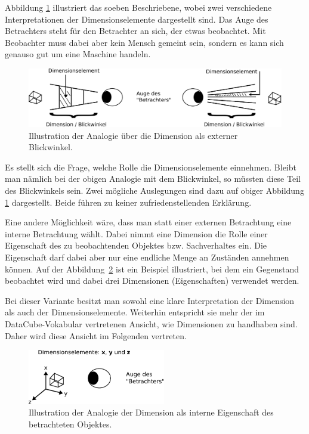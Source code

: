 \documentclass[11pt]{article}
\newcommand{\com}[1]{\marginpar{\em {\small{#1}}}} %
\begin{document}
Abbildung \ref{fig:DimensionelementAnalogy_PointOfViewParts} illustriert das soeben Beschriebene, wobei zwei verschiedene Interpretationen der Dimensionselemente dargestellt sind. Das Auge des Betrachters steht für den Betrachter an sich, der etwas beobachtet. Mit Beobachter muss dabei aber kein Mensch gemeint sein, sondern es kann sich genauso gut um eine Maschine handeln. \\

%
%
\begin{figure}[h!]
    \centering
    \includegraphics[width=12.5cm]{DataCube/DimensionelementAnalogy_PointOfViewParts.pdf}
    \caption{Illustration der Analogie über die Dimension als externer Blickwinkel.}
    \label{fig:DimensionelementAnalogy_PointOfViewParts}
\end{figure}

\noindent
Es stellt sich die Frage, welche Rolle die Dimensionselemente einnehmen. Bleibt man nämlich bei der obigen Analogie mit dem Blickwinkel, so müssten diese Teil des Blickwinkels sein. Zwei mögliche Auslegungen sind dazu auf obiger Abbildung \ref{fig:DimensionelementAnalogy_PointOfViewParts} dargestellt. Beide führen zu keiner zufriedenstellenden Erklärung.

\noindent
Eine andere Möglichkeit\com{Eigenschaft} wäre, dass man statt einer externen Betrachtung eine interne Betrachtung wählt. Dabei nimmt eine Dimension die Rolle einer Eigenschaft des zu beobachtenden Objektes bzw. Sachverhaltes ein. Die Eigenschaft darf dabei aber nur eine endliche Menge an Zuständen annehmen können. Auf der \mbox{Abbildung \ref{fig:DimensionelementAnalogy_ViewedObjectItself}} ist ein Beispiel illustriert, bei dem ein Gegenstand beobachtet wird und dabei drei Dimensionen (Eigenschaften) verwendet werden. 


\newpage
\noindent
Bei dieser Variante besitzt man sowohl eine klare Interpretation der Dimension als auch der Dimensionselemente. Weiterhin entspricht sie mehr der im DataCube-Vokabular vertretenen Ansicht, wie Dimensionen zu handhaben sind. Daher wird diese Ansicht im Folgenden vertreten. \\

%
%
\begin{figure}[h!]
    \centering
    \includegraphics[width=6cm]{DataCube/DimensionelementAnalogy_ViewedObjectItself.pdf}
    \caption{Illustration der Analogie der Dimension als interne Eigenschaft des betrachteten Objektes.}
    \label{fig:DimensionelementAnalogy_ViewedObjectItself}
\end{figure}
\end{document}
